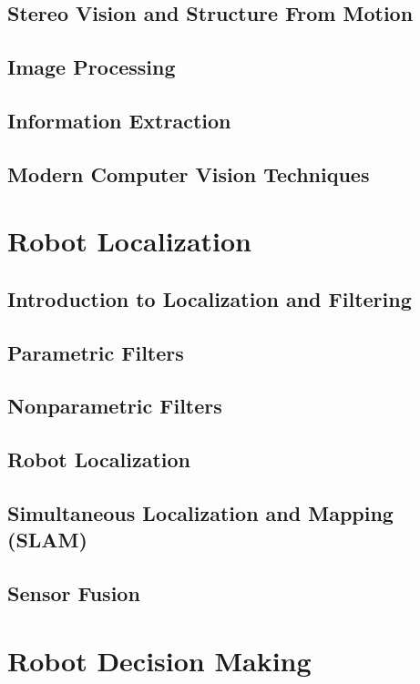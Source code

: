 \documentclass[nohyper,nobib]{tufte-book}
\begin{document}
\chapter{Stereo Vision and Structure From Motion}

\chapter{Image Processing}

\chapter{Information Extraction}

\chapter{Modern Computer Vision Techniques}


\part{Robot Localization}
\chapter{Introduction to Localization and Filtering}

\chapter{Parametric Filters}

\chapter{Nonparametric Filters}

\chapter{Robot Localization}

\chapter{Simultaneous Localization and Mapping (SLAM)}

\chapter{Sensor Fusion}


\part{Robot Decision Making}
\end{document}

